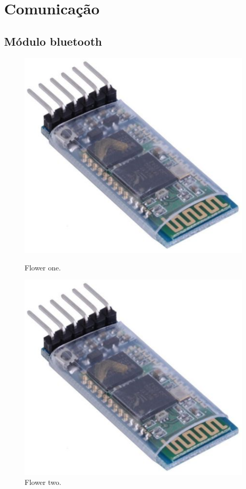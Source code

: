 \section{Comunicação}

\subsection{Módulo bluetooth}


\begin{figure}[!tbp]
	\centering
	\begin{minipage}[b]{0.4\textwidth}
		\includegraphics[width=\textwidth]{img/hardware/bluetooth_zs-040.png}
		\caption{Flower one.}
	\end{minipage}
	\hfill
	\begin{minipage}[b]{0.4\textwidth}
		\includegraphics[width=\textwidth]{img/hardware/bluetooth_zs-040.png}
		\caption{Flower two.}
	\end{minipage}
\end{figure}



